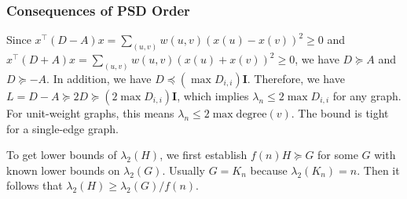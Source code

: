 \subsubsection{Consequences of PSD Order}

Since $x^\top (D-A) x = \sum_{(u,v)} w(u,v)(x(u)-x(v))^2 \ge 0$ and $x^\top (D+A) x = \sum_{(u,v)} w(u,v)(x(u)+x(v))^2 \ge 0$, we have $D \succeq A$ and $D \succeq -A$. In addition, we have $D \preceq (\max D_{i,i}) \boldsymbol{I}$. Therefore, we have $L = D-A \succeq 2D \succeq (2\max D_{i,i}) \boldsymbol{I}$, which implies $\lambda_n \le 2\max D_{i,i}$ for any graph. For unit-weight graphs, this means $\lambda_n \le 2 \max \text{degree}(v)$. The bound is tight for a single-edge graph.

To get lower bounds of $\lambda_2(H)$, we first establish $f(n) H \succeq G$ for some $G$ with known lower bounds on $\lambda_2(G)$. Usually $G=K_n$ because $\lambda_2(K_n) = n$. Then it follows that $\lambda_2(H) \ge \lambda_2(G)/f(n)$.

